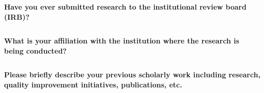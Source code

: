 \documentclass[11pt]{article}
\begin{document}
{\bfseries Have you ever submitted research to the institutional review board (IRB)?}
\begin{lstlisting}[mathescape]

\end{lstlisting}
\hfill

{\bfseries What is your affiliation with the institution where the research is being conducted?}
\begin{lstlisting}[mathescape]

\end{lstlisting}
\hfill

{\bfseries Please briefly describe your previous scholarly work including research, quality improvement initiatives, publications, etc.}
\begin{lstlisting}[mathescape]

\end{lstlisting}
\hfill
\end{document}
